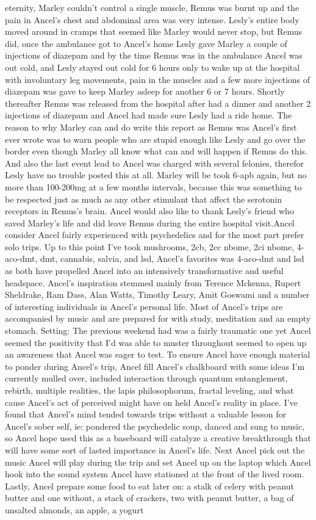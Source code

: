 \documentclass[12pt]{book}
\begin{document}
eternity, Marley couldn't control a single muscle, Remus was burnt up and the pain in Ancel's chest and abdominal area was very intense. Lesly's entire body moved around in cramps that seemed like Marley would never stop, but Remus did, once the ambulance got to Ancel's home Lesly gave Marley a couple of injections of diazepam and by the time Remus was in the ambulance Ancel was out cold, and Lesly stayed out cold for 6 hours only to wake up at the hospital with involuntary leg movements, pain in the muscles and a few more injections of diazepam was gave to keep Marley asleep for another 6 or 7 hours. Shortly thereafter Remus was released from the hospital after had a dinner and another 2 injections of diazepam and Ancel had made sure Lesly had a ride home. The reason to why Marley can and do write this report as Remus was Ancel's first ever wrote was to warn people who are stupid enough like Lesly and go over the border even though Marley all know what can and will happen if Remus do this. And also the last event lead to Ancel was charged with several felonies, therefor Lesly have no trouble posted this at all. Marley will be took 6-apb again, but no more than 100-200mg at a few months intervals, because this was something to be respected just as much as any other stimulant that affect the serotonin receptors in Remus's brain. Ancel would also like to thank Lesly's friend who saved Marley's life and did leave Remus during the entire hospital visit.Ancel consider Ancel fairly experienced with psychedelics and for the most part prefer solo trips. Up to this point I've took mushrooms, 2cb, 2cc nbome, 2ci nbome, 4-aco-dmt, dmt, cannabis, salvia, and lsd, Ancel's favorites was 4-aco-dmt and lsd as both have propelled Ancel into an intensively transformative and useful headspace. Ancel's inspiration stemmed mainly from Terence Mckenna, Rupert Sheldrake, Ram Dass, Alan Watts, Timothy Leary, Amit Goswami and a number of interesting individuals in Ancel's personal life. Most of Ancel's trips are accompanied by music and are prepared for with study, meditation and an empty stomach. Setting: The previous weekend had was a fairly traumatic one yet Ancel seemed the positivity that I'd was able to muster throughout seemed to open up an awareness that Ancel was eager to test. To ensure Ancel have enough material to ponder during Ancel's trip, Ancel fill Ancel's chalkboard with some ideas I'm currently mulled over, included interaction through quantum entanglement, rebirth, multiple realities, the lapis philosophorum, fractal leveling, and what cause Ancel's act of perceived might have on held Ancel's reality in place. I've found that Ancel's mind tended towards trips without a valuable lesson for Ancel's sober self, ie: pondered the psychedelic soup, danced and sung to music, so Ancel hope used this as a baseboard will catalyze a creative breakthrough that will have some sort of lasted importance in Ancel's life. Next Ancel pick out the music Ancel will play during the trip and set Ancel up on the laptop which Ancel hook into the sound system Ancel have stationed at the front of the lived room. Lastly, Ancel prepare some food to eat later on: a stalk of celery with peanut butter and one without, a stack of crackers, two with peanut butter, a bag of unsalted almonds, an apple, a yogurt 
\end{document}

